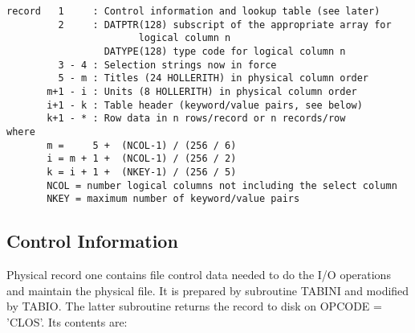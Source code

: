 \begin{verbatim}
record   1     : Control information and lookup table (see later)
         2     : DATPTR(128) subscript of the appropriate array for
                       logical column n
                 DATYPE(128) type code for logical column n
         3 - 4 : Selection strings now in force
         5 - m : Titles (24 HOLLERITH) in physical column order
       m+1 - i : Units (8 HOLLERITH) in physical column order
       i+1 - k : Table header (keyword/value pairs, see below)
       k+1 - * : Row data in n rows/record or n records/row
where
       m =     5 +  (NCOL-1) / (256 / 6)
       i = m + 1 +  (NCOL-1) / (256 / 2)
       k = i + 1 +  (NKEY-1) / (256 / 5)
       NCOL = number logical columns not including the select column
       NKEY = maximum number of keyword/value pairs

\end{verbatim}

\subsection{Control Information }
Physical record one contains file control data needed to do the I/O
operations and maintain the physical file.  It is prepared by
subroutine TABINI and modified by TABIO.  The latter subroutine
returns the record to disk on OPCODE = 'CLOS'.  Its contents are:

